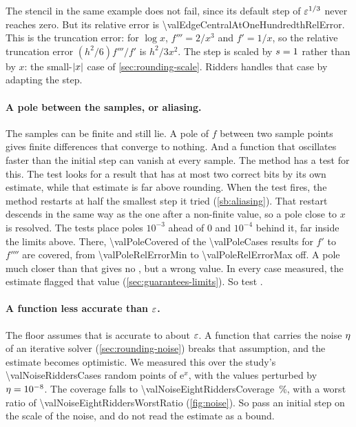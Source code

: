 The stencil in the same example does not fail, since its default step of $\varepsilon^{1/3}$ never reaches zero. But its
relative error is \num{\valEdgeCentralAtOneHundredthRelError}. This is the truncation error: for $\log x$,
$f''' = 2/x^3$ and $f' = 1/x$, so the relative truncation error $(h^2/6) f''' / f'$ is $h^2 / 3x^2$. The step is
scaled by $s = 1$ rather than by $x$: the small-$\lvert x \rvert$ case of \cref{sec:rounding-scale}. Ridders handles
that case by adapting the step.

\begin{marginfigure}
\centering

\caption{The evaluations and the relative error of Ridders for $\log x$ at $x = 2^{-k}$, against $k$. Each halving
of $x$ costs about two evaluations, until the budget is used up at $k = \num{\valRiddersEdgeCapExponent}$. Ten correct
digits hold to $k = \num{\valRiddersEdgeTenDigitsExponent}$, and digits are lost from there. A value is returned to
$k = \num{\valRiddersEdgeLimitExponent}$, and the result is non-finite beyond.\label{fig:ridders-edge}}
\end{marginfigure}

\paragraph{A pole between the samples, or aliasing.} The samples can be finite and still lie. A pole of $f$ between
two sample points gives finite differences that converge to nothing. And a function that oscillates faster than the
initial step can vanish at every sample. The method has a test for this. The test looks for a result that has at
most two correct bits by its own estimate, while that estimate is far above rounding. When the test fires, the method
restarts at half the smallest step it tried (\cref{sb:aliasing}). That restart descends in the same way as the one
after a non-finite value, so a pole close to $x$ is resolved. The tests place poles $10^{-3}$ ahead of 0 and
$10^{-4}$ behind it, far inside the limits above. There, \num{\valPoleCovered} of the \num{\valPoleCases} results
for $f'$ to $f''''$ are covered, from \num{\valPoleRelErrorMin} to \num{\valPoleRelErrorMax} off. A pole much closer
than that gives no , but a wrong value. In every case measured, the estimate flagged that value
(\cref{sec:guarantees-limits}). So test .

\paragraph{A function less accurate than $\varepsilon$.} The floor assumes that  is accurate to about
$\varepsilon$. A function that carries the noise $\eta$ of an iterative solver (\cref{sec:rounding-noise}) breaks that
assumption, and the estimate becomes optimistic. We measured this over the study's \num{\valNoiseRiddersCases}
random points of $\mathrm{e}^x$, with the values perturbed by $\eta = 10^{-8}$. The coverage falls to
\SI{\valNoiseEightRiddersCoverage}{\percent}, with a worst ratio of \num{\valNoiseEightRiddersWorstRatio}
(\cref{fig:noise}). So pass an initial step on the scale of the noise, and do not read the estimate as a bound.

